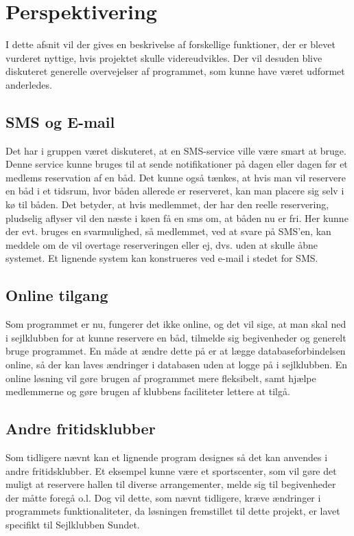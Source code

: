 \chapter{Perspektivering}

I dette afsnit vil der gives en beskrivelse af forskellige funktioner, der er blevet vurderet nyttige, hvis projektet skulle videreudvikles. 
Der vil desuden blive diskuteret generelle overvejelser af programmet, som kunne have været udformet anderledes. 

\section*{SMS og E-mail}
Det har i gruppen været diskuteret, at en SMS-service ville være smart at bruge. 
Denne service kunne bruges til at sende notifikationer på dagen eller dagen før et medlems reservation af en båd.
Det kunne også tænkes, at hvis man vil reservere en båd i et tidsrum, hvor båden allerede er reserveret, kan man placere sig selv i kø til båden.
Det betyder, at hvis medlemmet, der har den reelle reservering, pludselig aflyser vil den næste i køen få en sms om, at båden nu er fri.
Her kunne der evt. bruges en svarmulighed, så medlemmet, ved at svare på SMS'en, kan meddele om de vil overtage reserveringen eller ej, dvs. uden at skulle åbne systemet.
Et lignende system kan konstrueres ved e-mail i stedet for SMS.

\section*{Online tilgang}
Som programmet er nu, fungerer det ikke online, og det vil sige, at man skal ned i sejlklubben for at kunne reservere en båd, tilmelde sig begivenheder og generelt bruge programmet. 
En måde at ændre dette på er at lægge databaseforbindelsen online, så der kan laves ændringer i databasen uden at logge på i sejlklubben. 
En online løsning vil gøre brugen af programmet mere fleksibelt, samt hjælpe medlemmerne og gøre brugen af klubbens faciliteter lettere at tilgå.

\section*{Andre fritidsklubber}
Som tidligere nævnt kan et lignende program designes så det kan anvendes i andre fritidsklubber.
Et eksempel kunne være et sportscenter, som vil gøre det muligt at reservere hallen til diverse arrangementer, melde sig til begivenheder der måtte foregå o.l. 
Dog vil dette, som nævnt tidligere, kræve ændringer i programmets funktionaliteter, da løsningen fremstillet til dette projekt, er lavet specifikt til Sejlklubben Sundet.

